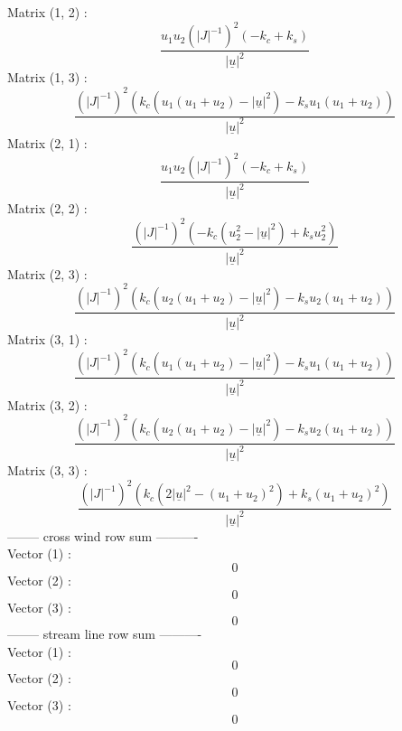 Matrix (1, 2) :
\begin{dmath}
\frac{u_{1} u_{2} \left(|J|^{-1}\right)^{2} \left(- k_{c} + k_{s}\right)}{|\underline{u}|^{2}}
\end{dmath}
Matrix (1, 3) :
\begin{dmath}
\frac{\left(|J|^{-1}\right)^{2} \left(k_{c} \left(u_{1} \left(u_{1} + u_{2}\right) - |\underline{u}|^{2}\right) - k_{s} u_{1} \left(u_{1} + u_{2}\right)\right)}{|\underline{u}|^{2}}
\end{dmath}
Matrix (2, 1) :
\begin{dmath}
\frac{u_{1} u_{2} \left(|J|^{-1}\right)^{2} \left(- k_{c} + k_{s}\right)}{|\underline{u}|^{2}}
\end{dmath}
Matrix (2, 2) :
\begin{dmath}
\frac{\left(|J|^{-1}\right)^{2} \left(- k_{c} \left(u_{2}^{2} - |\underline{u}|^{2}\right) + k_{s} u_{2}^{2}\right)}{|\underline{u}|^{2}}
\end{dmath}
Matrix (2, 3) :
\begin{dmath}
\frac{\left(|J|^{-1}\right)^{2} \left(k_{c} \left(u_{2} \left(u_{1} + u_{2}\right) - |\underline{u}|^{2}\right) - k_{s} u_{2} \left(u_{1} + u_{2}\right)\right)}{|\underline{u}|^{2}}
\end{dmath}
Matrix (3, 1) :
\begin{dmath}
\frac{\left(|J|^{-1}\right)^{2} \left(k_{c} \left(u_{1} \left(u_{1} + u_{2}\right) - |\underline{u}|^{2}\right) - k_{s} u_{1} \left(u_{1} + u_{2}\right)\right)}{|\underline{u}|^{2}}
\end{dmath}
Matrix (3, 2) :
\begin{dmath}
\frac{\left(|J|^{-1}\right)^{2} \left(k_{c} \left(u_{2} \left(u_{1} + u_{2}\right) - |\underline{u}|^{2}\right) - k_{s} u_{2} \left(u_{1} + u_{2}\right)\right)}{|\underline{u}|^{2}}
\end{dmath}
Matrix (3, 3) :
\begin{dmath}
\frac{\left(|J|^{-1}\right)^{2} \left(k_{c} \left(2 |\underline{u}|^{2} - \left(u_{1} + u_{2}\right)^{2}\right) + k_{s} \left(u_{1} + u_{2}\right)^{2}\right)}{|\underline{u}|^{2}}
\end{dmath}
-------- cross wind row sum ---------- \\
Vector (1) :
\begin{dmath}
0
\end{dmath}
Vector (2) :
\begin{dmath}
0
\end{dmath}
Vector (3) :
\begin{dmath}
0
\end{dmath}
-------- stream line row sum ---------- \\
Vector (1) :
\begin{dmath}
0
\end{dmath}
Vector (2) :
\begin{dmath}
0
\end{dmath}
Vector (3) :
\begin{dmath}
0
\end{dmath}
